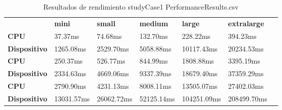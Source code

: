 \begin{table}[H]
    \centering
    \begin{tabular}{lllllll}
    \rowcolor[HTML]{DAE8FC} \ &  \textbf{mini} &  \textbf{small} &  \textbf{medium} &  \textbf{	large} &  \textbf{	extralarge} \\
    \cellcolor[HTML]{DAE8FC} \textbf{CPU} & 37.37ms & 74.68ms & 132.70ms & 	228.22ms & 	394.23ms \\
    \rowcolor[HTML]{EFEFEF} \cellcolor[HTML]{DAE8FC} \textbf{Dispositivo} & 1265.08ms & 2529.70ms & 5058.88ms & 	10117.43ms & 	20234.53ms \\
    \cellcolor[HTML]{DAE8FC} \textbf{CPU} & 250.37ms & 526.77ms & 844.99ms & 	1808.88ms & 	3395.19ms \\
    \rowcolor[HTML]{EFEFEF} \cellcolor[HTML]{DAE8FC} \textbf{Dispositivo} & 2334.63ms & 4669.06ms & 9337.39ms & 	18679.40ms & 	37359.29ms \\
    \cellcolor[HTML]{DAE8FC} \textbf{CPU} & 2790.90ms & 4231.13ms & 8008.11ms & 	13505.07ms & 	27402.03ms \\
    \rowcolor[HTML]{EFEFEF} \cellcolor[HTML]{DAE8FC} \textbf{Dispositivo} & 13031.57ms & 26062.72ms & 52125.14ms & 	104251.09ms & 	208499.70ms \\
    \end{tabular}
    \caption[Resultados de rendimiento studyCase1 PerformanceResults.csv]{{Resultados de rendimiento studyCase1 PerformanceResults.csv}}
    \label{table_global_studyCase1_PerformanceResults}
\end{table}